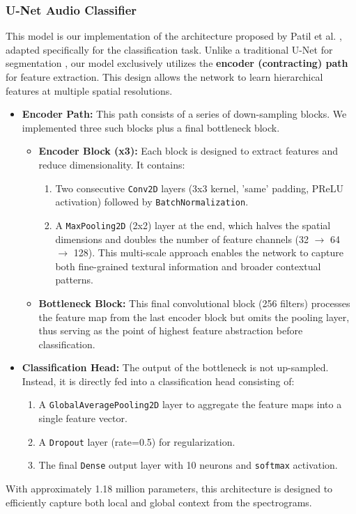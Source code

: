 \documentclass[11pt,a4paper]{article}
\begin{document}
\subsubsection{U-Net Audio Classifier}
This model is our implementation of the architecture proposed by Patil et al. \cite{patil}, adapted specifically for the classification task. Unlike a traditional U-Net for segmentation \textbf{\cite{ronneberger2015unet}}, %
our model exclusively utilizes the \textbf{encoder (contracting) path} for feature extraction. This design allows the network to learn hierarchical features at multiple spatial resolutions.
\begin{itemize}
    \item \textbf{Encoder Path:} This path consists of a series of down-sampling blocks. We implemented three such blocks plus a final bottleneck block.
    \begin{itemize}
        \item \textbf{Encoder Block (x3):} Each block is designed to extract features and reduce dimensionality. It contains:
        \begin{enumerate}
            \item Two consecutive \texttt{Conv2D} layers (3x3 kernel, 'same' padding, PReLU activation) followed by \texttt{BatchNormalization}.
            \item A \texttt{MaxPooling2D} (2x2) layer at the end, which halves the spatial dimensions and doubles the number of feature channels (32 \(\rightarrow\) 64 \(\rightarrow\) 128). This multi-scale approach enables the network to capture both fine-grained textural information and broader contextual patterns.
        \end{enumerate}
        \item \textbf{Bottleneck Block:} This final convolutional block (256 filters) processes the feature map from the last encoder block but omits the pooling layer, thus serving as the point of highest feature abstraction before classification.
    \end{itemize}
    \item \textbf{Classification Head:} The output of the bottleneck is not up-sampled. Instead, it is directly fed into a classification head consisting of:
    \begin{enumerate}
        \item A \texttt{GlobalAveragePooling2D} layer to aggregate the feature maps into a single feature vector.
        \item A \texttt{Dropout} layer (rate=0.5) for regularization.
        \item The final \texttt{Dense} output layer with 10 neurons and \texttt{softmax} activation.
    \end{enumerate}
\end{itemize}
With approximately 1.18 million parameters, this architecture is designed to efficiently capture both local and global context from the spectrograms.
\end{document}
